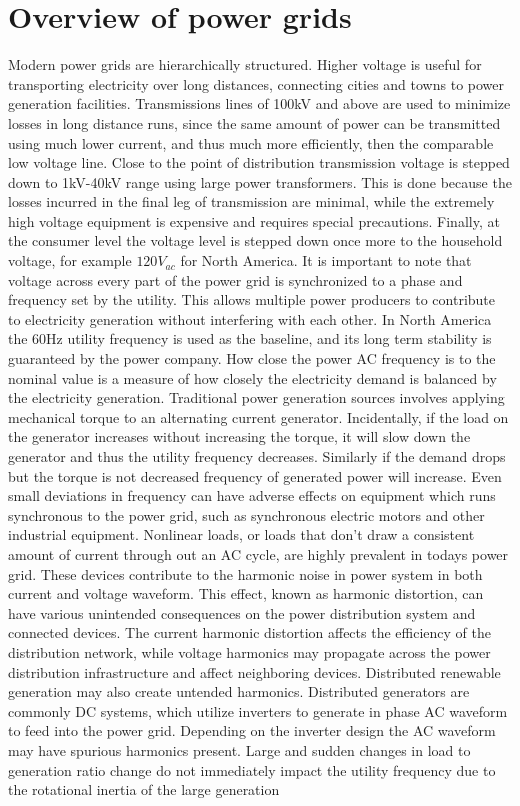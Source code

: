 \section{Overview of power grids}
Modern power grids are hierarchically structured. Higher voltage is useful for transporting electricity over long distances, connecting cities and towns to power generation facilities. Transmissions lines of 100kV and above are used to minimize losses in long distance runs, since the same amount of power can be transmitted using much lower current, and thus much more efficiently, then the comparable low voltage line. Close to the point of distribution transmission voltage is stepped down to 1kV-40kV range using large power transformers. This is done because the losses incurred in the final leg of transmission are minimal, while the extremely high voltage equipment is expensive and requires special precautions.\cite{sivanagaraju2008electric} Finally, at the consumer level the voltage level is stepped down once more to the household voltage, for example $120V_{ac}$ for North America. It is important to note that voltage across every part of the power grid is synchronized to a phase and frequency set by the utility. This allows multiple power producers to contribute to electricity generation without interfering with each other.\cite{blaabjerg2006overview} In North America the 60Hz utility frequency is used as the baseline, and its long term stability is guaranteed by the power company. How close the power AC frequency is to the nominal value is a measure of how closely the electricity demand is balanced by the electricity generation. Traditional power generation sources involves applying mechanical torque to an alternating current generator. Incidentally, if the load on the generator increases without increasing the torque, it will slow down the generator and thus the utility frequency decreases. Similarly if the demand drops but the torque is not decreased frequency of generated power will increase. Even small deviations in frequency can have adverse effects on equipment which runs synchronous to the power grid, such as synchronous electric motors and other industrial equipment.\cite{morren2006wind} Nonlinear loads, or loads that don't draw a consistent amount of current through out an AC cycle, are highly prevalent in todays power grid. These devices contribute to the harmonic noise in power system in both current and voltage waveform. This effect, known as harmonic distortion, can have various unintended consequences on the power distribution system and connected devices. The current harmonic distortion affects the efficiency of the distribution network, while voltage harmonics may propagate across the power distribution infrastructure and affect neighboring devices. Distributed renewable generation may also create untended harmonics. Distributed generators are commonly DC systems, which utilize inverters to generate in phase AC waveform to feed into the power grid. Depending on the inverter design the AC waveform may have spurious harmonics present.\cite{morren2006wind} Large and sudden changes in load to generation ratio change do not immediately impact the utility frequency due to the rotational inertia of the large generation 